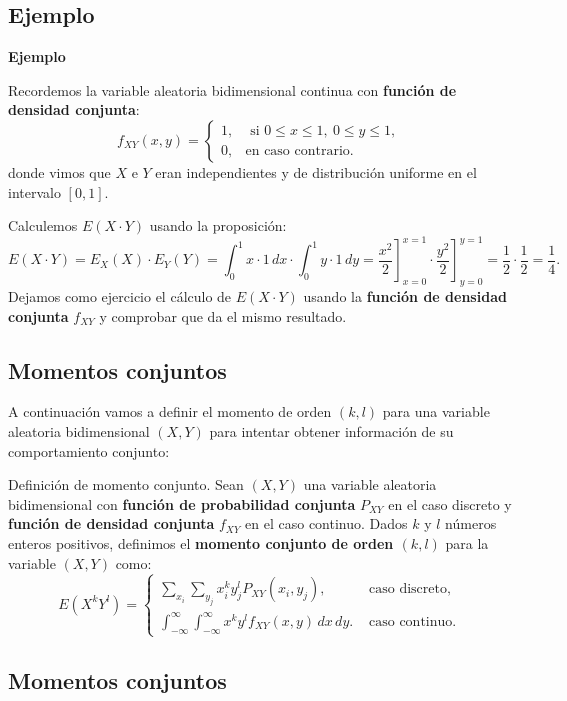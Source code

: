 \documentclass[]{book}
\begin{document}
\hypertarget{ejemplo-61}{%
\subsection{Ejemplo}\label{ejemplo-61}}

\textbf{Ejemplo}

Recordemos la variable aleatoria bidimensional continua con \textbf{función de densidad conjunta}:
\[
f_{XY}(x,y)=\begin{cases}
1, & \mbox{ si }0\leq x\leq 1,\ 0\leq y\leq 1, \\
0, & \mbox{en caso contrario.}
\end{cases}
\]
donde vimos que \(X\) e \(Y\) eran independientes y de distribución uniforme en el intervalo \([0,1]\).

Calculemos \(E(X\cdot Y)\) usando la proposición:
\[
E(X\cdot Y)=E_X(X)\cdot E_Y(Y)=\int_0^1 x\cdot 1\, dx\cdot \int_0^1 y\cdot 1\, dy =\left.\frac{x^2}{2}\right]_{x=0}^{x=1}\cdot \left.\frac{y^2}{2}\right]_{y=0}^{y=1}=\frac{1}{2}\cdot \frac{1}{2}=\frac{1}{4}.
\]
Dejamos como ejercicio el cálculo de \(E(X\cdot Y)\) usando la \textbf{función de densidad conjunta} \(f_{XY}\) y comprobar que da el mismo resultado.

\hypertarget{momentos-conjuntos}{%
\subsection{Momentos conjuntos}\label{momentos-conjuntos}}

A continuación vamos a definir el momento de orden \((k,l)\) para una variable aleatoria bidimensional \((X,Y)\) para intentar obtener información de su comportamiento conjunto:

Definición de momento conjunto.
Sean \((X,Y)\) una variable aleatoria bidimensional con \textbf{función de probabilidad conjunta} \(P_{XY}\) en el caso discreto y \textbf{función de densidad conjunta} \(f_{XY}\) en el caso continuo. Dados \(k\) y \(l\) números enteros positivos, definimos el \textbf{momento conjunto de orden \((k,l)\)} para la variable \((X,Y)\) como:
\[
E\left(X^k Y^l\right)=\begin{cases}
\sum_{x_i}\sum_{y_j} x_i^k y_j^l P_{XY}(x_i,y_j), & \mbox{ caso discreto,} \\
\int_{-\infty}^\infty\int_{-\infty}^\infty x^k y^l f_{XY}(x,y)\, dx\, dy. & \mbox{ caso continuo.}
\end{cases}
\]

\hypertarget{momentos-conjuntos-1}{%
\subsection{Momentos conjuntos}\label{momentos-conjuntos-1}}
\end{document}
